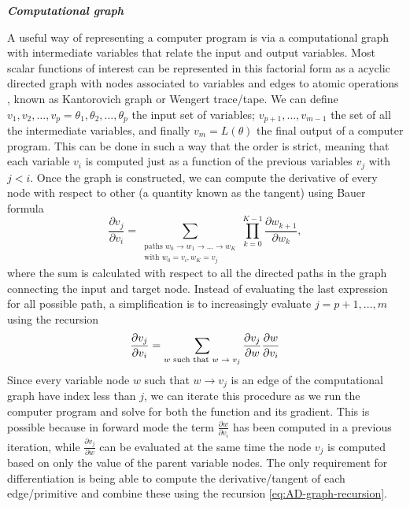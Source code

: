 \vspace*{10px}
\noindent \textbf{\textit{Computational graph}}
\vspace*{5px}

A useful way of representing a computer program is via a computational graph with intermediate variables that relate the input and output variables. 
Most scalar functions of interest can be represented in this factorial form as a acyclic directed graph with nodes associated to variables and edges to atomic operations \cite{griewank2008evaluatingderivatives, Griewack-on-AD}, known as Kantorovich graph \cite{kantorovich1957mathematical} or Wengert trace/tape\cite{Wengert_1964, Bauer_1974}. 
We can define $v_1, v_2, \ldots, v_p = \theta_1, \theta_2, \ldots, \theta_p$ the input set of variables; $v_{p+1}, \ldots, v_{m-1}$ the set of all the intermediate variables, and finally $v_m = L(\theta)$ the final output of a computer program. 
This can be done in such a way that the order is strict, meaning that each variable $v_i$ is computed just as a function of the previous variables $v_j$ with $j < i$. 
Once the graph is constructed, we can compute the derivative of every node with respect to other (a quantity known as the tangent) using Bauer formula \cite{Bauer_1974, Oktay_randomized-AD}
\begin{equation}
    \frac{\partial v_j}{\partial v_i}
    = 
    \sum_{\substack{ \text{paths }w_0 \rightarrow w_1 \rightarrow \ldots \rightarrow w_K \\
                    \text{with } w_0=v_i, w_K = v_j}}
    \prod_{k=0}^{K-1} \frac{\partial w_{k+1}}{\partial w_{k}},
\end{equation}
where the sum is calculated with respect to all the directed paths in the graph connecting the input and target node.
Instead of evaluating the last expression for all possible path, a simplification is to increasingly evaluate $j=p+1, \ldots, m$ using the recursion 
\begin{equation}
    \frac{\partial v_j}{\partial v_i}
    = 
    \sum_\text{$w$\text{ such that} $w \rightarrow v_j$}
    \frac{\partial v_j}{\partial w}
    \frac{\partial w}{\partial v_i} 
    \label{eq:AD-graph-recursion}
\end{equation}
Since every variable node $w$ such that $w \rightarrow v_j$ is an edge of the computational graph have index less than $j$, we can iterate this procedure as we run the computer program and solve for both the function and its gradient.
This is possible because in forward mode the term $\frac{\partial w}{\partial v_i}$ has been computed in a previous iteration, while $\frac{\partial v_j}{\partial w}$ can be evaluated at the same time the node $v_j$ is computed based on only the value of the parent variable nodes. 
The only requirement for differentiation is being able to compute the derivative/tangent of each edge/primitive and combine these using the recursion \eqref{eq:AD-graph-recursion}.


